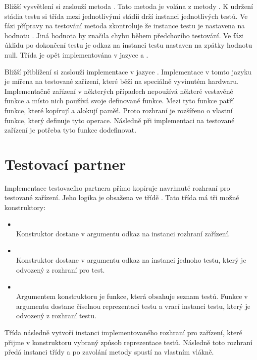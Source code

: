 Bližší vysvětlení si zaslouží metoda . Tato metoda je volána z metody . K udržení stádia testu si třída mezi jednotlivými stádii drží instanci jednotlivých testů. Ve fázi přípravy na testování metoda zkontroluje že instance testu je nastavena na hodnotu . Jiná hodnota by značila chybu během předchozího testování. Ve fázi úklidu po dokončení testu je odkaz na instanci testu nastaven na zpátky hodnotu null. Třída  je opět implementována v jazyce \csharp{} a \cpp{}.

Bližší přiblížení si zaslouží implementace v jazyce \cpp{}. Implementace v tomto jazyku je mířena na testované zařízení, které běží na speciálně vyvinutém hardwaru. Implementačně zařízení v některých případech nepoužívá některé vestavěné funkce a místo nich používá svoje definované funkce. Mezi tyto funkce patří funkce, které kopírují a alokují paměť. Proto rozhraní je rozšířeno o vlastní funkce, který definuje tyto operace. Následně při implementaci na testované zařízení je potřeba tyto funkce dodefinovat. 

\section{Testovací partner}
Implementace testovacího partnera přímo kopíruje navrhnuté rozhraní pro testované zařízení. Jeho logika je obsažena ve třídě . Tato třída má tři možné konstruktory:

\begin{itemize} 
    \item {} \\
    Konstruktor dostane v argumentu odkaz na instanci rozhraní zařízení.
    \item {} \\
    Konstruktor dostane v argumentu odkaz na instanci jednoho testu, který je odvozený z rozhraní pro test.
    \item {} \\
    Argumentem konstruktoru je funkce, která obsahuje seznam testů. Funkce v argumentu dostane číselnou reprezentaci testu a vrací instanci testu, který je odvozený z rozhraní testu.
\end{itemize}

Třída následně vytvoří instanci implementovaného rozhraní pro zařízení, které přijme v konstruktoru vybraný způsob reprezentace testů. Následně toto rozhraní předá instanci třídy  a po zavolání metody  spustí  na vlastním vlákně.

